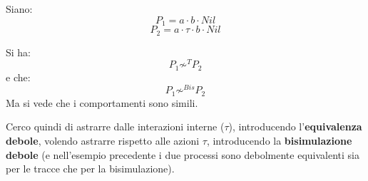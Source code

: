 \begin{esempio}
  Siano:
  \[P_1=a\cdot b\cdot Nil\]
  \[P_2=a\cdot \tau \cdot b\cdot Nil\]
   \begin{center}
  \end{center}
   \begin{center}
  \end{center}
  Si ha:
  \[P_1\not\sim^T P_2\]
  e che:
  \[P_1\not\sim^{Bis} P_2\]
  Ma si vede che i comportamenti sono simili.
  \label{debole}
\end{esempio}
Cerco quindi di astrarre dalle interazioni interne ($\tau$), introducendo
l'\textbf{equivalenza debole}, volendo astrarre rispetto alle azioni $\tau$,
introducendo la \textbf{bisimulazione debole} (e nell'esempio precedente i due
processi sono debolmente equivalenti sia per le tracce che per la
bisimulazione).
